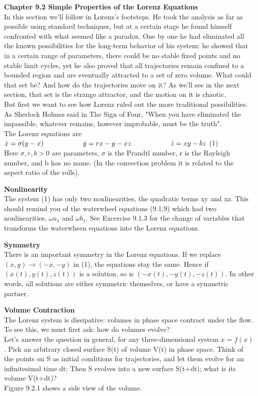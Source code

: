 \documentclass{article}
\newcommand\tab[1][1cm]{\hspace*{#1}}
\begin{document}
\textbf {Chapter 9.2 Simple Properties of the Lorenz Equations} \\
In this section we'll follow in Lorenz's footsteps. He took the analysis as far as possible using standard techniques, but at a certain stage he found himself confronted with what seemed like a paradox. One by one he had eliminated all the known possibilities for the long-term behavior of his system: he showed that in a certain range of parameters, there could be no stable fixed points and no stable limit cycles, yet he also proved that all trajectories remain confined to a bounded region and are eventually attracted to a set of zero volume. What could that set be? And how do the trajectories move on it? As we'll see in the next section, that set is the strange attractor, and the motion on it is chaotic. \\ \tab
But first we want to see how Lorenz ruled out the more traditional possibilities. As Sherlock Holmes said in The Sign of Four, "When you have eliminated the impossible, whatever remains, however improbable, must be the truth". \\ \tab The Lorenz equations are \\ \tab \tab
$\dot{x}=\sigma(y-x) \\ \tab \tab
\dot{y}=rx-y-xz \\ \tab \tab
\dot{z}=xy-bz$ \tab (1) \\

Here $\sigma , r, b>0$ are parameters, $\sigma$ is the Prandtl number, r is the Rayleigh number, and b has no name. (In the convection problem it is related to the aspect ratio of the rolls). 

\textbf {Nonlinearity} \\ \tab
The system (1) has only two nonlinearities, the quadratic terms xy and xz. This should remind you of the waterwheel equations (9.1.9) which had two nonlinearities, $\omega a_{1}$ and $\omega b_{1}$. See Excercise 9.1.3 for the change of variables that transforms the waterwheen equations into the Lorenz equations.

\textbf {Symmetry} \\ \tab
There is an important symmetry in the Lorenz equations. If we replace $(x,y) \to (-x, -y)$ in (1), the equations stay the same. Hence if $(x(t), y(t), z(t))$ is a solution, so is $(-x(t), -y(t), -z(t))$. In other words, all solutions are either symmetric themselves, or have a symmetric partner. 

\textbf {Volume Contraction} \\ \tab
The Lorenz system is dissipative: volumes in phase space contract under the flow. To see this, we must first ask: how do volumes evolve? \\ \tab
Let's answer the question in general, for any three-dimensional system $\dot{x}=f(x)$. Pick an arbitrary closed surface S(t) of volume V(t) in phase space. Think of the points on S as initial conditions for trajectories, and let them evolve for an infinitesimal time dt: Then S evolves into a new surface S(t+dt); what is its volume V(t+dt)? \\ \tab
Figure 9.2.1 shows a side view of the volume. \\
\end{document}
